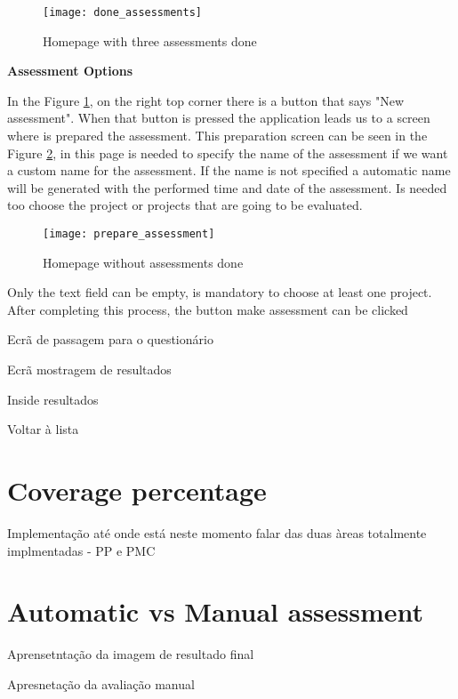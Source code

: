 \begin{figure}[h]
	\begin{center}
		\leavevmode
		\texttt{[image: done\_assessments]}
		\caption{Homepage with three assessments done}
		\label{fig:done_assessments}
	\end{center}
\end{figure}


\vspace{10 mm}

\textbf{Assessment Options}

In the Figure \ref{fig:done_assessments}, on the right top corner there is a button that says "New assessment". When that button is pressed the application leads us to a screen where is prepared the assessment. This preparation screen can be seen in the Figure \ref{fig:prepare_assessment}, in this page is needed to specify the name of the assessment if we want a custom name for the assessment. If the name is not specified a automatic name will be generated with the performed time and date of the assessment. Is needed too choose the project or projects that are going to be evaluated.

\begin{figure}[h]
	\begin{center}
		\leavevmode
		\texttt{[image: prepare\_assessment]}
		\caption{Homepage without assessments done}
		\label{fig:prepare_assessment}
	\end{center}
\end{figure}

Only the text field can be empty, is mandatory to choose at least one project. After completing this process, the button make assessment can be clicked

Ecrã de passagem para o questionário

Ecrã mostragem de resultados

Inside resultados

Voltar à lista

\section{Coverage percentage} \label{sec:coverage}


Implementação até onde está neste momento falar das duas àreas totalmente implmentadas - PP e PMC
	
\section{Automatic vs Manual assessment} \label{sec:automatic}

Aprensetntação da imagem de resultado final

Apresnetação da avaliação manual